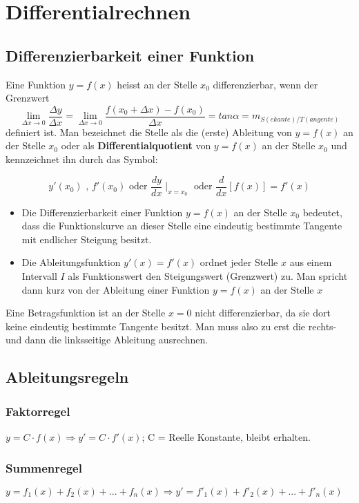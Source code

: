 \chapter{Differentialrechnen}
\section{Differenzierbarkeit einer Funktion}
Eine Funktion \(y=f(x)\) heisst an der Stelle \(x_0\) differenzierbar, wenn der Grenzwert
\[ \lim\limits_{\Delta x \rightarrow 0}{\frac{\Delta y}{\Delta x}} = \lim\limits_{\Delta x \rightarrow 0}{\frac{f(x_0 + \Delta x)-f(x_0)}{\Delta x}} = tan \alpha = m_{S(ekante)/T(angente)} \]
definiert ist. Man bezeichnet die Stelle als die (erste) Ableitung von \(y=f(x)\) an der Stelle \(x_0\) oder als \textbf{Differentialquotient} von \(y=f(x)\) an der Stelle \(x_0\) und kennzeichnet ihn durch das Symbol:

$$ y'(x_0) \text{ , } f'(x_0) \text{ oder } \frac{dy}{dx} \mid_{x=x_0} \text{ oder } \frac{d}{dx}[f(x)] = f'(x)$$

\begin{itemize}
	\item Die Differenzierbarkeit einer Funktion \(y=f(x)\) an der Stelle \(x_0\) bedeutet, dass die Funktionskurve an dieser Stelle eine eindeutig bestimmte Tangente mit endlicher Steigung besitzt.
	\item Die Ableitungsfunktion \(y'(x)=f'(x)\) ordnet jeder Stelle \(x\) aus einem Intervall \(I\) als Funktionswert den Steigungswert (Grenzwert) zu. Man spricht dann kurz von der Ableitung einer Funktion \(y=f(x)\) an der Stelle \(x\)
\end{itemize}
Eine Betragsfunktion ist an der Stelle \(x=0\) nicht differenzierbar, da sie dort keine eindeutig bestimmte Tangente besitzt. Man muss also zu erst die rechts- und dann die linksseitige Ableitung ausrechnen.

\section{Ableitungsregeln}
\subsection{Faktorregel}
\(y = C \cdot f(x) \Rightarrow y' = C \cdot f'(x)\); C = Reelle Konstante, bleibt erhalten.
\subsection{Summenregel}
\(y = f_1(x)+f_2(x)+ ... +f_n(x) \Rightarrow y'=f'_1(x) + f'_2(x)+...+f'_n(x)\)


